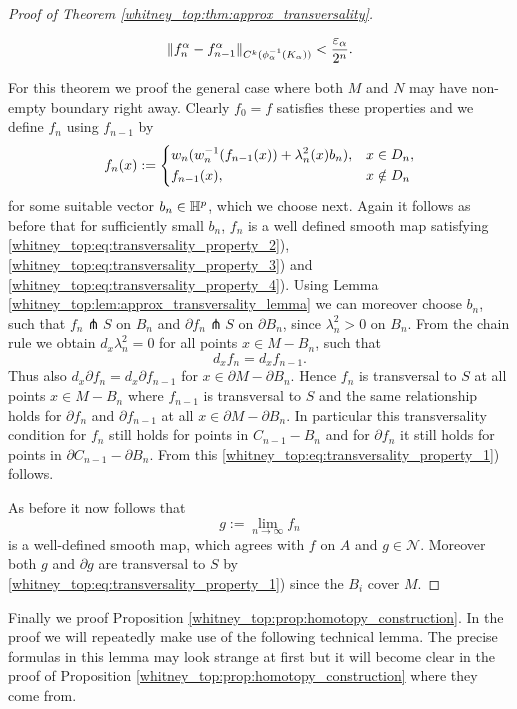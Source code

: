 \begin{proof}[Proof of Theorem \ref{whitney_top:thm:approx_transversality}]
\begin{enumerate}[1)]
        \[
        \lVert f_n^\alpha - f_{n-1}^\alpha\rVert_{C^k(\phi_\alpha^{-1}(K_\alpha))} < \frac{\varepsilon_\alpha}{2^n}.
        \]
    \end{enumerate}
    For this theorem we proof the general case where both $M$ and $N$ may have non-empty boundary right away. Clearly $f_0 = f$ satisfies these properties and we define $f_n$ using $f_{n-1}$ by
    \[
    f_n(x) := \begin{dcases}
        w_n(w_n^{-1}(f_{n-1}(x)) + \lambda_n^2(x)b_n), & x \in D_n, \\
        f_{n-1}(x), & x \notin D_n
    \end{dcases}
    \]
    for some suitable vector $b_n \in \mathbb{H}^p$, which we choose next. Again it follows as before that for sufficiently small $b_n$, $f_n$ is a well defined smooth map satisfying \ref{whitney_top:eq:transversality_property_2}), \ref{whitney_top:eq:transversality_property_3}) and \ref{whitney_top:eq:transversality_property_4}). Using Lemma \ref{whitney_top:lem:approx_transversality_lemma} we can moreover choose $b_n$, such that $f_n \pitchfork S$ on $B_n$ and $\partial f_n \pitchfork S$ on $\partial B_n$, since $\lambda_n^2 > 0$ on $B_n$. From the chain rule we obtain  $d_x\lambda_n^2 = 0$ for all points $x \in M - B_n$, such that 
    \[
    d_xf_n = d_xf_{n-1}.
    \]
    Thus also $d_x \partial f_n = d_x \partial f_{n-1}$ for $x \in \partial M - \partial B_n$. Hence $f_n$ is transversal to $S$ at all points $x \in M - B_n$ where $f_{n-1}$ is transversal to $S$ and the same relationship holds for $\partial f_n$ and $\partial f_{n-1}$ at all $x \in \partial M - \partial B_n$. In particular this transversality condition for $f_n$ still holds for points in $C_{n-1} - B_n$ and for $\partial f_n$ it still holds for points in $\partial C_{n-1} - \partial B_n$. From this \ref{whitney_top:eq:transversality_property_1}) follows. 
    
    As before it now follows that 
    \[
    g := \lim_{n \to \infty} f_n
    \]
    is a well-defined smooth map, which agrees with $f$ on $A$ and $g \in \mathcal{N}$. Moreover both $g$ and $\partial g$ are transversal to $S$ by \ref{whitney_top:eq:transversality_property_1}) since the $B_i$ cover $M$.
\end{proof}

Finally we proof Proposition \ref{whitney_top:prop:homotopy_construction}. In the proof we will repeatedly make use of the following technical lemma. The precise formulas in this lemma may look strange at first but it will become clear in the proof of Proposition \ref{whitney_top:prop:homotopy_construction} where they come from.

